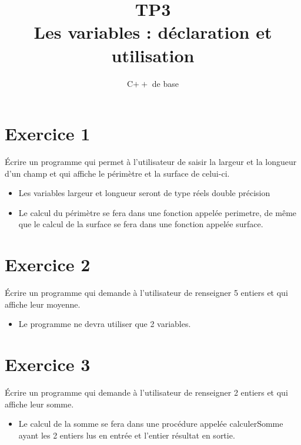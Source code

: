 \documentclass{article}
\title{TP3\\ Les variables : déclaration et utilisation}
\date{C$++$ de base}
\begin{document}
	\maketitle 
	\section*{Exercice 1}
		Écrire un programme qui permet à l'utilisateur de saisir la largeur et la longueur d'un champ et qui affiche le périmètre et la surface de celui-ci.
		\begin{itemize}
			\item Les variables largeur et longueur seront de type réels double précision
			\item Le calcul du périmètre se fera dans une fonction appelée perimetre, de même que le calcul de la surface se fera dans une fonction appelée surface.
		\end{itemize}
	\section*{Exercice 2}
		Écrire un programme qui demande à l'utilisateur de renseigner 5 entiers et qui affiche leur moyenne.
		\begin{itemize}
			\item Le programme ne devra utiliser que 2 variables.
		\end{itemize}		
	\section*{Exercice 3}
		Écrire un programme qui demande à l'utilisateur de renseigner 2 entiers et qui affiche leur somme.
		\begin{itemize}
			\item Le calcul de la somme se fera dans une procédure appelée calculerSomme ayant les 2 entiers lus en entrée et l'entier résultat en sortie.
		\end{itemize}		
	
\end{document}
